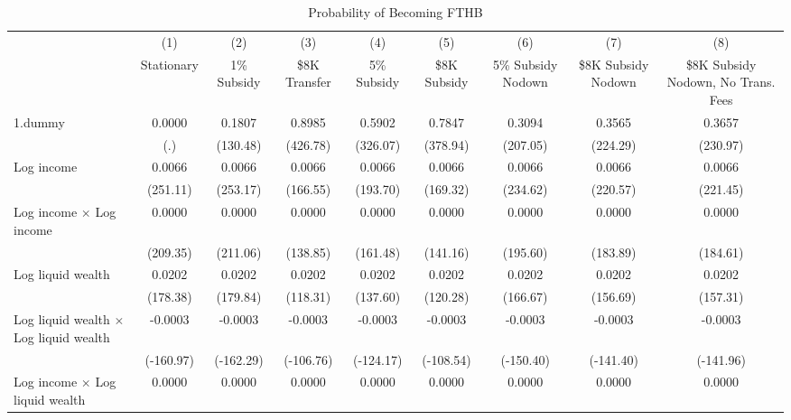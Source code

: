 \begin{table}[htbp]\centering
\caption{Probability of Becoming FTHB}
\begin{tabular}{l*{8}{c}}
\hline\hline
                    &\multicolumn{1}{c}{(1)}&\multicolumn{1}{c}{(2)}&\multicolumn{1}{c}{(3)}&\multicolumn{1}{c}{(4)}&\multicolumn{1}{c}{(5)}&\multicolumn{1}{c}{(6)}&\multicolumn{1}{c}{(7)}&\multicolumn{1}{c}{(8)}\\
                    &\multicolumn{1}{c}{Stationary}&\multicolumn{1}{c}{1\% Subsidy}&\multicolumn{1}{c}{\$8K Transfer}&\multicolumn{1}{c}{5\% Subsidy}&\multicolumn{1}{c}{\$8K Subsidy}&\multicolumn{1}{c}{5\% Subsidy Nodown}&\multicolumn{1}{c}{\$8K Subsidy Nodown}&\multicolumn{1}{c}{\$8K Subsidy Nodown, No Trans. Fees}\\
\hline
1.dummy             &      0.0000&      0.1807&      0.8985&      0.5902&      0.7847&      0.3094&      0.3565&      0.3657\\
                    &         (.)&    (130.48)&    (426.78)&    (326.07)&    (378.94)&    (207.05)&    (224.29)&    (230.97)\\
[1em]
Log income          &      0.0066&      0.0066&      0.0066&      0.0066&      0.0066&      0.0066&      0.0066&      0.0066\\
                    &    (251.11)&    (253.17)&    (166.55)&    (193.70)&    (169.32)&    (234.62)&    (220.57)&    (221.45)\\
[1em]
Log income $\times$ Log income&      0.0000&      0.0000&      0.0000&      0.0000&      0.0000&      0.0000&      0.0000&      0.0000\\
                    &    (209.35)&    (211.06)&    (138.85)&    (161.48)&    (141.16)&    (195.60)&    (183.89)&    (184.61)\\
[1em]
Log liquid wealth   &      0.0202&      0.0202&      0.0202&      0.0202&      0.0202&      0.0202&      0.0202&      0.0202\\
                    &    (178.38)&    (179.84)&    (118.31)&    (137.60)&    (120.28)&    (166.67)&    (156.69)&    (157.31)\\
[1em]
Log liquid wealth $\times$ Log liquid wealth&     -0.0003&     -0.0003&     -0.0003&     -0.0003&     -0.0003&     -0.0003&     -0.0003&     -0.0003\\
                    &   (-160.97)&   (-162.29)&   (-106.76)&   (-124.17)&   (-108.54)&   (-150.40)&   (-141.40)&   (-141.96)\\
[1em]
Log income $\times$ Log liquid wealth&      0.0000&      0.0000&      0.0000&      0.0000&      0.0000&      0.0000&      0.0000&      0.0000\\

\end{tabular}
\end{table}
